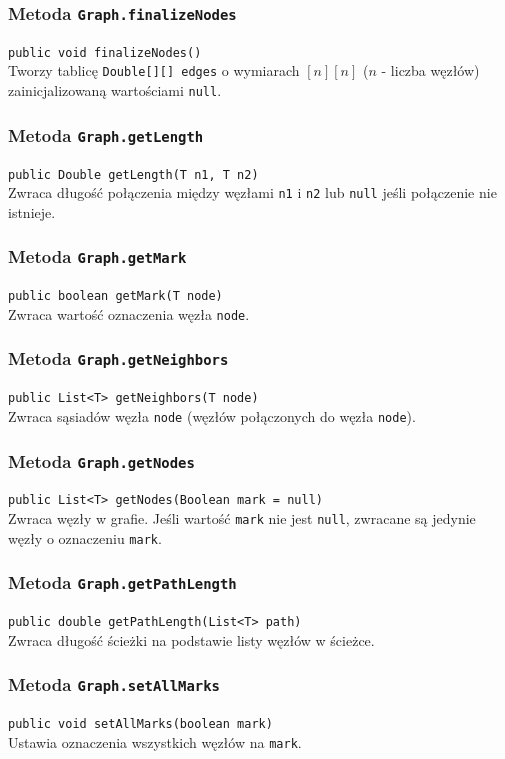 \documentclass{article}
\begin{document}
\subsubsection{Metoda \texttt{Graph.finalizeNodes}}
\texttt{public void finalizeNodes()} \\
Tworzy tablicę \texttt{Double[][] edges} o wymiarach \([n][n]\) (\(n\) - liczba węzłów) zainicjalizowaną wartościami \texttt{null}.

\subsubsection{Metoda \texttt{Graph.getLength}}
\texttt{public Double getLength(T n1, T n2)} \\
Zwraca długość połączenia między węzłami \texttt{n1} i \texttt{n2} lub \texttt{null} jeśli połączenie nie istnieje.

\subsubsection{Metoda \texttt{Graph.getMark}}
\texttt{public boolean getMark(T node)} \\
Zwraca wartość oznaczenia węzła \texttt{node}.

\subsubsection{Metoda \texttt{Graph.getNeighbors}}
\texttt{public List<T> getNeighbors(T node)} \\
Zwraca sąsiadów węzła \texttt{node} (węzłów połączonych do węzła \texttt{node}).

\subsubsection{Metoda \texttt{Graph.getNodes}}
\texttt{public List<T> getNodes(Boolean mark = null)} \\
Zwraca węzły w grafie. Jeśli wartość \texttt{mark} nie jest \texttt{null}, zwracane są jedynie węzły o oznaczeniu \texttt{mark}.

\subsubsection{Metoda \texttt{Graph.getPathLength}}
\texttt{public double getPathLength(List<T> path)} \\
Zwraca długość ścieżki na podstawie listy węzłów w ścieżce.

\subsubsection{Metoda \texttt{Graph.setAllMarks}}
\texttt{public void setAllMarks(boolean mark)} \\
Ustawia oznaczenia wszystkich węzłów na \texttt{mark}.
\end{document}

